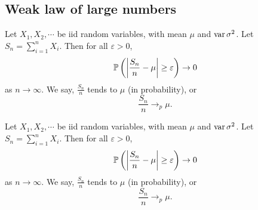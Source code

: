 \subsection{Weak law of large numbers}

\begin{note}
  \begin{field}
    \begin{thm}
      Let $X_1, X_2, \cdots$ be iid random variables, with mean $\mu$ and $\var \sigma^2$.
      Let $S_n = \sum_{i = 1}^n X_i$.
      Then for all $\varepsilon > 0$,
      \[
        \P\left(\left|\frac{S_n}{n} - \mu\right| \geq \varepsilon\right) \to 0
      \]
      as $n\to \infty$.
      We say, $\frac{S_n}{n}$ tends to $\mu$ (in probability), or
      \[
        \frac{S_n}{n}\to_p \mu.
      \]
    \end{thm}
  \end{field}
  \begin{field}
    \begin{thm}
      Let $X_1, X_2, \cdots$ be iid random variables, with mean $\mu$ and $\var \sigma^2$.
      Let $S_n = \sum_{i = 1}^n X_i$.
      Then for all $\varepsilon > 0$,
      \[
        \P\left(\left|\frac{S_n}{n} - \mu\right| \geq \varepsilon\right) \to 0
      \]
      as $n\to \infty$.
      We say, $\frac{S_n}{n}$ tends to $\mu$ (in probability), or
      \[
        \frac{S_n}{n}\to_p \mu.
      \]
    \end{thm}
  \end{field}
  \xplain{}%
\end{note}

